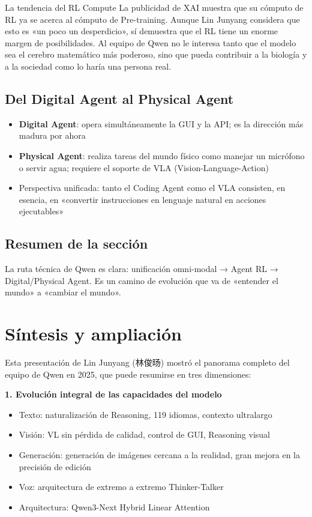 \documentclass[a4paper]{article}
\begin{document}
\begin{knowledgebox}{La tendencia del RL Compute}
La publicidad de XAI muestra que su cómputo de RL ya se acerca al cómputo de Pre-training. Aunque Lin Junyang considera que esto es «un poco un desperdicio», sí demuestra que el RL tiene un enorme margen de posibilidades. Al equipo de Qwen no le interesa tanto que el modelo sea el cerebro matemático más poderoso, sino que pueda contribuir a la biología y a la sociedad como lo haría una persona real.
\end{knowledgebox}

\subsection{Del Digital Agent al Physical Agent}

\begin{itemize}
    \item \textbf{Digital Agent}: opera simultáneamente la GUI y la API; es la dirección más madura por ahora
    \item \textbf{Physical Agent}: realiza tareas del mundo físico como manejar un micrófono o servir agua; requiere el soporte de VLA (Vision-Language-Action)
    \item Perspectiva unificada: tanto el Coding Agent como el VLA consisten, en esencia, en «convertir instrucciones en lenguaje natural en acciones ejecutables»
\end{itemize}

\subsection{Resumen de la sección}

La ruta técnica de Qwen es clara: unificación omni-modal → Agent RL → Digital/Physical Agent. Es un camino de evolución que va de «entender el mundo» a «cambiar el mundo».

\section{Síntesis y ampliación}

Esta presentación de Lin Junyang (林俊旸) mostró el panorama completo del equipo de Qwen en 2025, que puede resumirse en tres dimensiones:

\textbf{1. Evolución integral de las capacidades del modelo}
\begin{itemize}
    \item Texto: naturalización de Reasoning, 119 idiomas, contexto ultralargo
    \item Visión: VL sin pérdida de calidad, control de GUI, Reasoning visual
    \item Generación: generación de imágenes cercana a la realidad, gran mejora en la precisión de edición
    \item Voz: arquitectura de extremo a extremo Thinker-Talker
    \item Arquitectura: Qwen3-Next Hybrid Linear Attention
\end{itemize}
\end{document}

